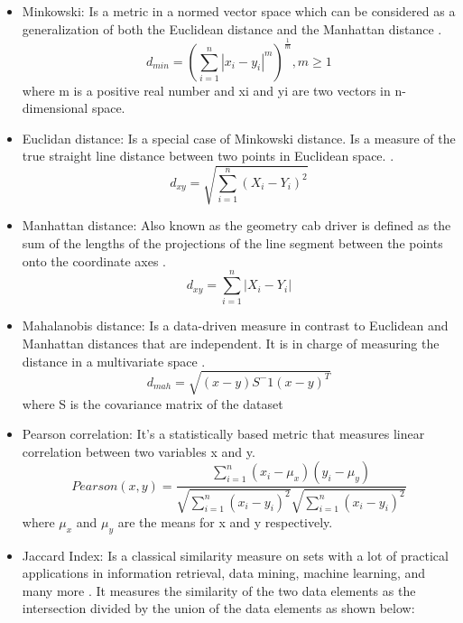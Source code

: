 \begin{itemize}
  \item Minkowski: Is a metric in a normed vector space which can be considered as a generalization of both the Euclidean distance and the Manhattan distance \citep{b56}.
    \begin{equation}
        d_{min} = (\sum_{i=1}^{n}|x_i - y_i|^m)^\frac{1}{m}, m\geq 1
    \end{equation}
    where m is a positive real number and xi and yi are two vectors in n-dimensional space.
    \item Euclidan distance: Is a special case of Minkowski distance. Is a measure of the true straight line distance between two points in Euclidean space. \citep{b57}.
    \begin{equation}
        d_{xy} =  \sqrt{\sum_{i=1}^{n}(X_{i}-Y_{i})^2}
    \end{equation}
     \item Manhattan distance: Also known as the geometry cab driver is defined as the
sum of the lengths of the projections of the line segment between the points onto the coordinate axes \citep{b58}.
     \begin{equation}
        d_{xy} =  \sum_{i=1}^{n}|X_{i}-Y_{i}|
    \end{equation}
    \item Mahalanobis distance: Is a data-driven measure in contrast to Euclidean and Manhattan distances that are independent. It is in charge of measuring the distance in a multivariate space \citep{b58}.
    \begin{equation}
        d_{mah}= \sqrt{(x-y)S^-1(x-y)^T}
    \end{equation}
    where S is the covariance matrix of the dataset
    \item Pearson correlation: It’s a statistically based metric that measures linear correlation between two variables x and y.
    \begin{equation}
        Pearson(x,y)= \frac{\sum_{i=1}^n(x_i-\mu_x)(y_i-\mu_y)}{\sqrt{\sum_{i=1}^n(x_i-y_i)^2}\sqrt{\sum_{i=1}^n(x_i-y_i)^2}}
    \end{equation}
    where $\mu_x$ and $\mu_y$ are the means for x and y respectively.
    \item Jaccard Index: Is a classical similarity measure on sets with a lot of practical applications in information retrieval, data mining, machine learning, and many more \citep{b35} \citep{b59}. It measures the similarity of the two data elements as the intersection divided by the union of the data elements as shown below:

\end{itemize}
